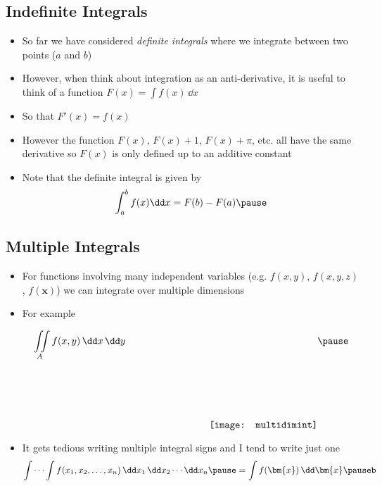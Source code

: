 \begin{slide}
\section[-1]{Indefinite Integrals}
  
\begin{PauseHighLight}
  \begin{itemize}
  \item So far we have considered \emph{definite integrals} where we
    integrate between two points ($a$ and $b$)\pause
  \item However, when think about integration as an
    anti-derivative, it is useful to think of a function
    $F(x)= \int f(x) \, \dd x$\pause
  \item So that $F'(x) = f(x)$\pause
  \item However the function $F(x)$, $F(x)+1$, $F(x)+\pi$, etc.{} all
    have the same derivative so $F(x)$ is only defined up to an
    additive constant\pause
  \item Note that the definite integral is given by
    \begin{align*}
      \int_a^b f(x) \dd x = F(b) - F(a)\pause
    \end{align*}
  \end{itemize}
\end{PauseHighLight}

\end{slide}



\begin{slide}
\section[-2]{Multiple Integrals}

\begin{PauseHighLight}
  \begin{itemize}
  \item For functions involving many independent variables
    (e.g. $f(x,y)$, $f(x,y,z)$, $f(\bm{x})$) we can integrate over
    multiple dimensions\pause
  \item For example
    \vspace*{-3cm}

    \begin{align*}
      \iint\limits_A f(x, y)\, \dd x\, \dd y \hspace{3cm}\raisebox{-3cm}{\texttt{[image: multidimint]}}\pause
    \end{align*}
  \item It gets tedious writing multiple integral signs and I tend to
    write just one
    \begin{align*}
     \int\cdots\int f(x_1, x_2,\ldots, x_n)  \, \dd x_1\, \dd
      x_2\cdots \dd x_n\pause
      =  \int f(\bm{x}) \, \dd \bm{x} \pauseb
    \end{align*}
  \end{itemize}
\end{PauseHighLight}


\end{slide}

